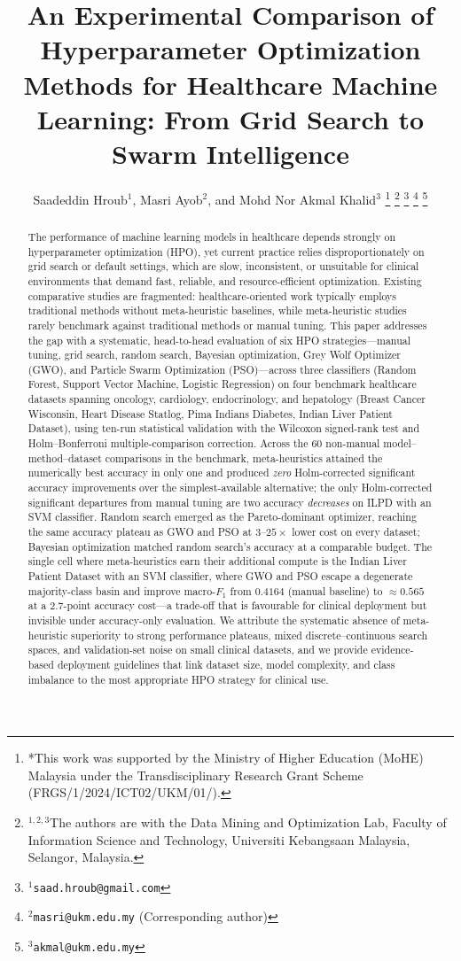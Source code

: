 \documentclass[letterpaper, 10 pt, conference]{ieeeconf}
\title{\LARGE \bf
An Experimental Comparison of Hyperparameter Optimization Methods for Healthcare Machine Learning: From Grid Search to Swarm Intelligence
}
\author{Saadeddin Hroub$^{1}$, Masri Ayob$^{2}$, and Mohd Nor Akmal Khalid$^{3}$%
	\thanks{*This work was supported by the Ministry of Higher Education (MoHE) Malaysia under the Transdisciplinary Research Grant Scheme (FRGS/1/2024/ICT02/UKM/01/).}%
	\thanks{$^{1,2,3}$The authors are with the Data Mining and Optimization Lab, Faculty of Information Science and Technology, Universiti Kebangsaan Malaysia, Selangor, Malaysia.}%
	\thanks{$^{1}${\tt\small saad.hroub@gmail.com}}%
	\thanks{$^{2}${\tt\small masri@ukm.edu.my} (Corresponding author)}%
	\thanks{$^{3}${\tt\small akmal@ukm.edu.my}}%
}
\begin{document}
	\raggedbottom
	\maketitle
	\thispagestyle{empty}
	\pagestyle{empty}

	\begin{abstract}

The performance of machine learning models in healthcare depends strongly on hyperparameter optimization (HPO), yet current practice relies disproportionately on grid search or default settings, which are slow, inconsistent, or unsuitable for clinical environments that demand fast, reliable, and resource-efficient optimization. Existing comparative studies are fragmented: healthcare-oriented work typically employs traditional methods without meta-heuristic baselines, while meta-heuristic studies rarely benchmark against traditional methods or manual tuning. This paper addresses the gap with a systematic, head-to-head evaluation of six HPO strategies---manual tuning, grid search, random search, Bayesian optimization, Grey Wolf Optimizer (GWO), and Particle Swarm Optimization (PSO)---across three classifiers (Random Forest, Support Vector Machine, Logistic Regression) on four benchmark healthcare datasets spanning oncology, cardiology, endocrinology, and hepatology (Breast Cancer Wisconsin, Heart Disease Statlog, Pima Indians Diabetes, Indian Liver Patient Dataset), using ten-run statistical validation with the Wilcoxon signed-rank test and Holm--Bonferroni multiple-comparison correction. Across the $60$ non-manual model--method--dataset comparisons in the benchmark, meta-heuristics attained the numerically best accuracy in only one and produced \emph{zero} Holm-corrected significant accuracy improvements over the simplest-available alternative; the only Holm-corrected significant departures from manual tuning are two accuracy \emph{decreases} on ILPD with an SVM classifier. Random search emerged as the Pareto-dominant optimizer, reaching the same accuracy plateau as GWO and PSO at $3$--$25\times$ lower cost on every dataset; Bayesian optimization matched random search's accuracy at a comparable budget. The single cell where meta-heuristics earn their additional compute is the Indian Liver Patient Dataset with an SVM classifier, where GWO and PSO escape a degenerate majority-class basin and improve macro-$F_1$ from $0.4164$ (manual baseline) to $\approx 0.565$ at a $2.7$-point accuracy cost---a trade-off that is favourable for clinical deployment but invisible under accuracy-only evaluation. We attribute the systematic absence of meta-heuristic superiority to strong performance plateaus, mixed discrete--continuous search spaces, and validation-set noise on small clinical datasets, and we provide evidence-based deployment guidelines that link dataset size, model complexity, and class imbalance to the most appropriate HPO strategy for clinical use.

	\end{abstract}
\end{document}
